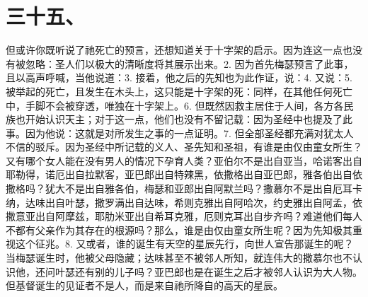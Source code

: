 
\section{三十五、}

但或许你既听说了祂死亡的预言，还想知道关于十字架的启示。因为连这一点也没有被忽略：圣人们以极大的清晰度将其展示出来。\newline{}2. 因为首先梅瑟预言了此事，且以高声呼喊，当他说道：\newline{}3. 接着，他之后的先知也为此作证，说：\newline{}4. 又说：\newline{}5. 被举起的死亡，且发生在木头上，这只能是十字架的死：同样，在其他任何死亡中，手脚不会被穿透，唯独在十字架上。\newline{}6. 但既然因救主居住于人间，各方各民族也开始认识天主；对于这一点，他们也没有不留记载：因为圣经中也提及了此事。因为他说：\newline{}这就是对所发生之事的一点证明。\newline{}7. 但全部圣经都充满对犹太人不信的驳斥。因为圣经中所记载的义人、圣先知和圣祖，有谁是由仅由童女所生？又有哪个女人能在没有男人的情况下孕育人类？亚伯尔不是出自亚当，哈诺客出自耶勒得，诺厄出自拉默客，亚巴郎出自特辣黑，依撒格出自亚巴郎，雅各伯出自依撒格吗？犹大不是出自雅各伯，梅瑟和亚郎出自阿默兰吗？撒慕尔不是出自厄耳卡纳，达味出自叶瑟，撒罗满出自达味，希则克雅出自阿哈次，约史雅出自阿孟，依撒意亚出自阿摩兹，耶肋米亚出自希耳克雅，厄则克耳出自步齐吗？难道他们每人不都有父亲作为其存在的根源吗？那么，谁是由仅由童女所生呢？因为先知极其重视这个征兆。\newline{}8. 又或者，谁的诞生有天空的星辰先行，向世人宣告那诞生的呢？当梅瑟诞生时，他被父母隐藏；达味甚至不被邻人所知，就连伟大的撒慕尔也不认识他，还问叶瑟还有别的儿子吗？亚巴郎也是在诞生之后才被邻人认识为大人物。但基督诞生的见证者不是人，而是来自祂所降自的高天的星辰。\par


